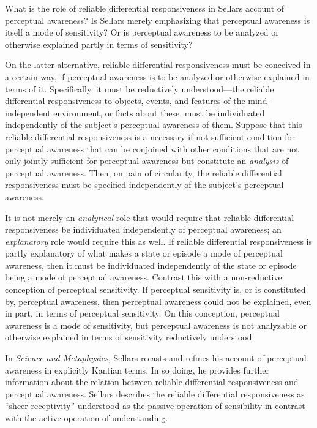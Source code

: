 \documentclass[12pt]{article}
\begin{document}
What is the role of reliable differential responsiveness in Sellars account of perceptual awareness? Is Sellars merely emphasizing that perceptual awareness is itself a mode of sensitivity? Or is perceptual awareness to be analyzed or otherwise explained partly in terms of sensitivity? 

On the latter alternative, reliable differential responsiveness must be conceived in a certain way, if perceptual awareness is to be analyzed or otherwise explained in terms of it. Specifically, it must be reductively understood---the reliable differential responsiveness to objects, events, and features of the mind-independent environment, or facts about these, must be individuated independently of the subject's perceptual awareness of them. Suppose that this reliable differential responsiveness is a necessary if not sufficient condition for perceptual awareness that can be conjoined with other conditions that are not only jointly sufficient for perceptual awareness but constitute an \emph{analysis} of perceptual awareness. Then, on pain of circularity, the reliable differential responsiveness must be specified independently of the subject's perceptual awareness. 

It is not merely an \emph{analytical} role that would require that reliable differential responsiveness be individuated independently of perceptual awareness; an \emph{explanatory} role would require this as well. If reliable differential responsiveness is partly explanatory of what makes a state or episode a mode of perceptual awareness, then it must be individuated independently of the state or episode being a mode of perceptual awareness. Contrast this with a non-reductive conception of perceptual sensitivity. If perceptual sensitivity is, or is constituted by, perceptual awareness, then perceptual awareness could not be explained, even in part, in terms of perceptual sensitivity. On this conception, perceptual awareness is a mode of sensitivity, but perceptual awareness is not analyzable or otherwise explained in terms of sensitivity reductively understood. 

In \emph{Science and Metaphysics}, Sellars recasts and refines his account of perceptual awareness in explicitly Kantian terms. In so doing, he provides further information about the relation between reliable differential responsiveness and perceptual awareness. Sellars describes the reliable differential responsiveness as ``sheer receptivity'' understood as the passive operation of sensibility in contrast with the active operation of understanding.
\end{document}
